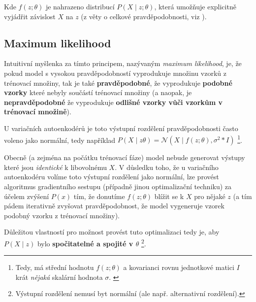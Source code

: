 Kde $f(z;\theta)$ je nahrazeno distribucí $P(X\mid z;\theta)$, která umožňuje explicitně vyjádřit závislost $X$ na $z$ (z věty o celkové pravděpodobnosti, viz \cite{Murphy2022}). \cite{Doersch2021}

\subsection{Maximum likelihood}
\label{sec:maximum_likelihood}
Intuitivní myšlenka za tímto principem, nazývaným \emph{maximum likelihood}, je, že pokud model s vysokou pravděpodobností vyprodukuje množinu vzorků z trénovací množiny, tak je také \textbf{pravděpodobné}, že vyprodukuje \textbf{podobné vzorky} které nebyly součástí trénovací množiny (a naopak, je  \textbf{nepravděpodobné} že vyprodukuje \textbf{odlišné vzorky vůči vzorkům v trénovací množině}). \cite{Doersch2021}

U variačních autoenkodérů je toto výstupní rozdělení pravděpodobnosti často voleno jako normální, tedy například $P(X\mid z\theta) = \mathcal{N}(X\mid f(z;\theta), \sigma^2 * I)$
\footnote{Tedy, má střední hodnotu $f(z;\theta)$ a kovarianci rovnu jednotkové matici $I$ krát \emph{nějaká} skalární hodnota $\sigma$. \cite{Doersch2021}}. \cite{Doersch2021}

Obecně (a zejména na počátku trénovací fáze) model nebude generovat výstupy které jsou \emph{identické} k libovolnému $X$.
V důsledku toho, že u variačního autoenkodéru volíme toto výstupní rozdělení jako normální, lze provést algoritmus gradientního sestupu (případně jinou optimalizační techniku) za účelem zvýšení $P(x)$ tím, že donutíme $f(z;\theta)$ blížit se k $X$ pro nějaké $z$ (a tím pádem iterativně zvyšovat pravděpodobnost, že model vygeneruje vzorek podobný vzorku z trénovací množiny). \cite{Doersch2021}

Důležitou vlastností pro možnost provést tuto optimalizaci tedy je, aby $P(X \mid z)$ bylo \textbf{spočitatelné a spojité v $\theta$} \footnote{Výstupní rozdělení nemusí byt normální (ale např. alternativní rozdělení).}. \cite{Doersch2021}